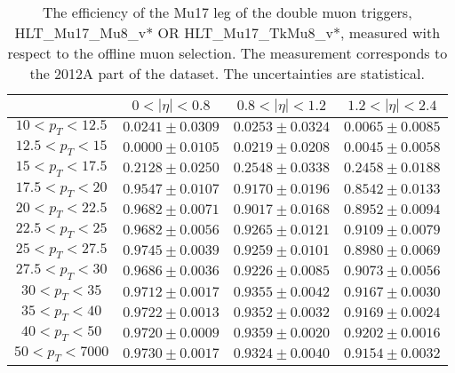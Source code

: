 \begin{table}[!ht]
\begin{center}
\begin{tabular}{c|c|c|c}
\hline & $0 < |\eta| < 0.8$ & $0.8 < |\eta| < 1.2$ & $1.2 < |\eta| < 2.4$  \\
\hline
$ 10 < p_T < 12.5$ & $0.0241 \pm 0.0309$ & $0.0253 \pm 0.0324$ & $0.0065 \pm 0.0085$  \\
$12.5 < p_T <  15$ & $0.0000 \pm 0.0105$ & $0.0219 \pm 0.0208$ & $0.0045 \pm 0.0058$  \\
$ 15 < p_T < 17.5$ & $0.2128 \pm 0.0250$ & $0.2548 \pm 0.0338$ & $0.2458 \pm 0.0188$  \\
$17.5 < p_T <  20$ & $0.9547 \pm 0.0107$ & $0.9170 \pm 0.0196$ & $0.8542 \pm 0.0133$  \\
$ 20 < p_T < 22.5$ & $0.9682 \pm 0.0071$ & $0.9017 \pm 0.0168$ & $0.8952 \pm 0.0094$  \\
$22.5 < p_T <  25$ & $0.9682 \pm 0.0056$ & $0.9265 \pm 0.0121$ & $0.9109 \pm 0.0079$  \\
$ 25 < p_T < 27.5$ & $0.9745 \pm 0.0039$ & $0.9259 \pm 0.0101$ & $0.8980 \pm 0.0069$  \\
$27.5 < p_T <  30$ & $0.9686 \pm 0.0036$ & $0.9226 \pm 0.0085$ & $0.9073 \pm 0.0056$  \\
$ 30 < p_T <  35$ & $0.9712 \pm 0.0017$ & $0.9355 \pm 0.0042$ & $0.9167 \pm 0.0030$  \\
$ 35 < p_T <  40$ & $0.9722 \pm 0.0013$ & $0.9352 \pm 0.0032$ & $0.9169 \pm 0.0024$  \\
$ 40 < p_T <  50$ & $0.9720 \pm 0.0009$ & $0.9359 \pm 0.0020$ & $0.9202 \pm 0.0016$  \\
$ 50 < p_T < 7000$ & $0.9730 \pm 0.0017$ & $0.9324 \pm 0.0040$ & $0.9154 \pm 0.0032$  \\
\hline
\hline
\end{tabular}
\caption{The efficiency of the Mu17 leg of the double muon triggers,
HLT\_Mu17\_Mu8\_v* OR HLT\_Mu17\_TkMu8\_v*,
measured with respect to the offline muon selection. 
The measurement corresponds to the 2012A part of the dataset.
The uncertainties are statistical.}
\label{tab:eff_muon_lead_dbl}
\end{center}
\end{table}


